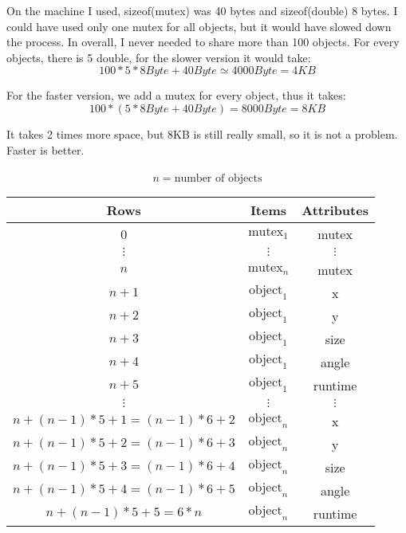On the machine I used, sizeof(mutex) was 40 bytes and sizeof(double) 8 
bytes. I could have used only one mutex for all objects, but it would 
have slowed down the process. In overall, I never needed to share more 
than 100 objects. For every objects, there is 5 double, for the slower 
version it would take:
\begin{displaymath}
                100 * 5 * 8Byte +40Byte \simeq 4000 Byte = 4 KB 
\end{displaymath}

For the faster version, we add a mutex for every object, thus it takes:
\begin{displaymath}
                        100 * (5*8Byte +40Byte) = 8000Byte = 8KB
\end{displaymath}

It takes 2 times more space, but 8KB is still really small, so it is 
not a problem. Faster is better.
\\
\\
\begin{displaymath}
    n = \mbox{number of objects}
\end{displaymath}
\label{tab:mosm:ms}
\begin{center}
\begin{tabular}{c|c|c}
   {\bf Rows }      & {\bf Items }  & {\bf Attributes} \\ \hline
   0                & $\mbox{mutex}_1$  & mutex \\ \hline
   $\vdots$         & $\vdots$          & $\vdots$      \\ \hline  
   $n$              & $\mbox{mutex}_n$  & mutex \\ \hline
   $n+1$            & $\mbox{object}_1$ & x \\ \hline
   $n+2$            & $\mbox{object}_1$ & y \\ \hline
   $n+3$            & $\mbox{object}_1$ & size \\ \hline 
   $n+4$            & $\mbox{object}_1$ & angle \\ \hline
   $n+5$            & $\mbox{object}_1$ & runtime \\ \hline
   $\vdots$         & $\vdots$ & $\vdots$ \\ \hline
   $n + (n-1)*5 +1 = (n-1)*6+2 $ & $\mbox{object}_n$ & x \\ \hline
   $n + (n-1)*5 +2 = (n-1)*6+3$ & $\mbox{object}_n$ & y \\ \hline
   $n + (n-1)*5 +3 = (n-1)*6+4$ & $\mbox{object}_n$ & size \\ \hline 
   $n + (n-1)*5 +4 = (n-1)*6+5$ & $\mbox{object}_n$ & angle \\ \hline
   $n + (n-1)*5 +5 = 6*n$ & $\mbox{object}_n$ & runtime
\end{tabular}
\end{center}

